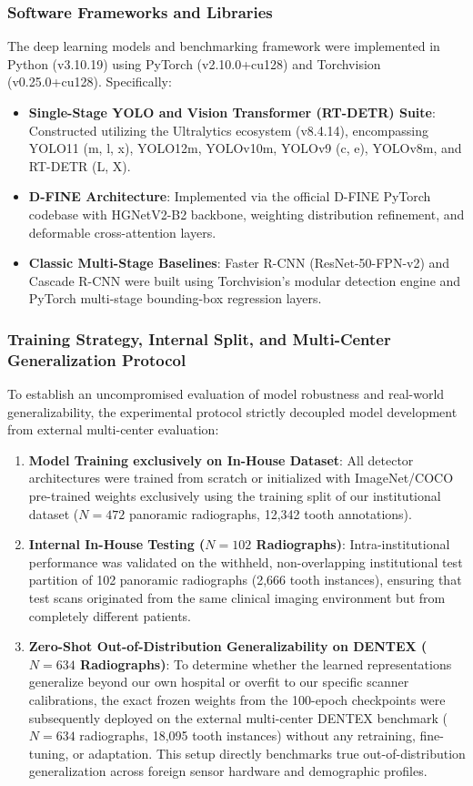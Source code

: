 \documentclass[10pt,journal,compsoc]{IEEEtran}
\begin{document}
\subsubsection{Software Frameworks and Libraries}
The deep learning models and benchmarking framework were implemented in Python (v3.10.19) using PyTorch (v2.10.0+cu128) and Torchvision (v0.25.0+cu128). Specifically:
\begin{itemize}
    \item \textbf{Single-Stage YOLO and Vision Transformer (RT-DETR) Suite}: Constructed utilizing the Ultralytics ecosystem (v8.4.14), encompassing YOLO11 (m, l, x), YOLO12m, YOLOv10m, YOLOv9 (c, e), YOLOv8m, and RT-DETR (L, X).
    \item \textbf{D-FINE Architecture}: Implemented via the official D-FINE PyTorch codebase with HGNetV2-B2 backbone, weighting distribution refinement, and deformable cross-attention layers.
    \item \textbf{Classic Multi-Stage Baselines}: Faster R-CNN (ResNet-50-FPN-v2) and Cascade R-CNN were built using Torchvision's modular detection engine and PyTorch multi-stage bounding-box regression layers.
\end{itemize}

\subsubsection{Training Strategy, Internal Split, and Multi-Center Generalization Protocol}
To establish an uncompromised evaluation of model robustness and real-world generalizability, the experimental protocol strictly decoupled model development from external multi-center evaluation:
\begin{enumerate}
    \item \textbf{Model Training exclusively on In-House Dataset}: All detector architectures were trained from scratch or initialized with ImageNet/COCO pre-trained weights exclusively using the training split of our institutional dataset ($N=472$ panoramic radiographs, 12,342 tooth annotations).
    \item \textbf{Internal In-House Testing ($N=102$ Radiographs)}: Intra-institutional performance was validated on the withheld, non-overlapping institutional test partition of 102 panoramic radiographs (2,666 tooth instances), ensuring that test scans originated from the same clinical imaging environment but from completely different patients.
    \item \textbf{Zero-Shot Out-of-Distribution Generalizability on DENTEX ($N=634$ Radiographs)}: To determine whether the learned representations generalize beyond our own hospital or overfit to our specific scanner calibrations, the exact frozen weights from the 100-epoch checkpoints were subsequently deployed on the external multi-center DENTEX benchmark ($N=634$ radiographs, 18,095 tooth instances) without any retraining, fine-tuning, or adaptation. This setup directly benchmarks true out-of-distribution generalization across foreign sensor hardware and demographic profiles.
\end{enumerate}
\end{document}
